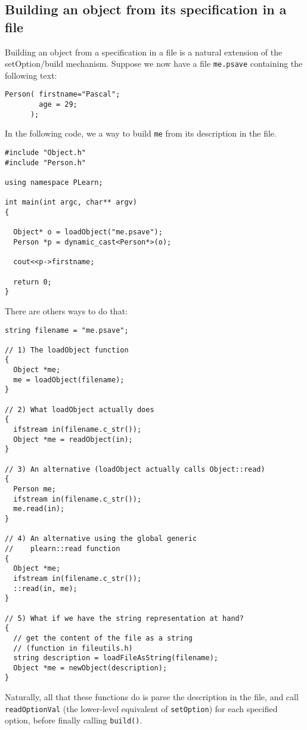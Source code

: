 \documentclass[11pt]{book}
\begin{document}
\subsection{Building an object from its specification in a file}

Building an object from a specification in a file is a natural
extension of the setOption/build mechanism.
Suppose we now have a file {\tt me.psave} containing the following text:

\begin{verbatim}
Person( firstname="Pascal"; 
        age = 29;
      );
\end{verbatim}

In the following code, we a way to build {\tt me} from its description
in the file.

\begin{verbatim}
#include "Object.h"
#include "Person.h"

using namespace PLearn;

int main(int argc, char** argv)
{

  Object* o = loadObject("me.psave"); 
  Person *p = dynamic_cast<Person*>(o);

  cout<<p->firstname;

  return 0;
}
\end{verbatim}


There are others ways to do that:

\begin{verbatim}
string filename = "me.psave";

// 1) The loadObject function
{
  Object *me;
  me = loadObject(filename);
}

// 2) What loadObject actually does
{
  ifstream in(filename.c_str());
  Object *me = readObject(in);
}

// 3) An alternative (loadObject actually calls Object::read)
{
  Person me; 
  ifstream in(filename.c_str());
  me.read(in);
}

// 4) An alternative using the global generic 
//    plearn::read function
{
  Object *me;
  ifstream in(filename.c_str());
  ::read(in, me);
}

// 5) What if we have the string representation at hand?
{
  // get the content of the file as a string
  // (function in fileutils.h)
  string description = loadFileAsString(filename);
  Object *me = newObject(description);
}
\end{verbatim}

Naturally, all that these functions do is parse the description in
the file, and call {\tt readOptionVal} (the lower-level equivalent
of {\tt setOption}) for each specified option, before finally calling
{\tt build()}.
\end{document}
